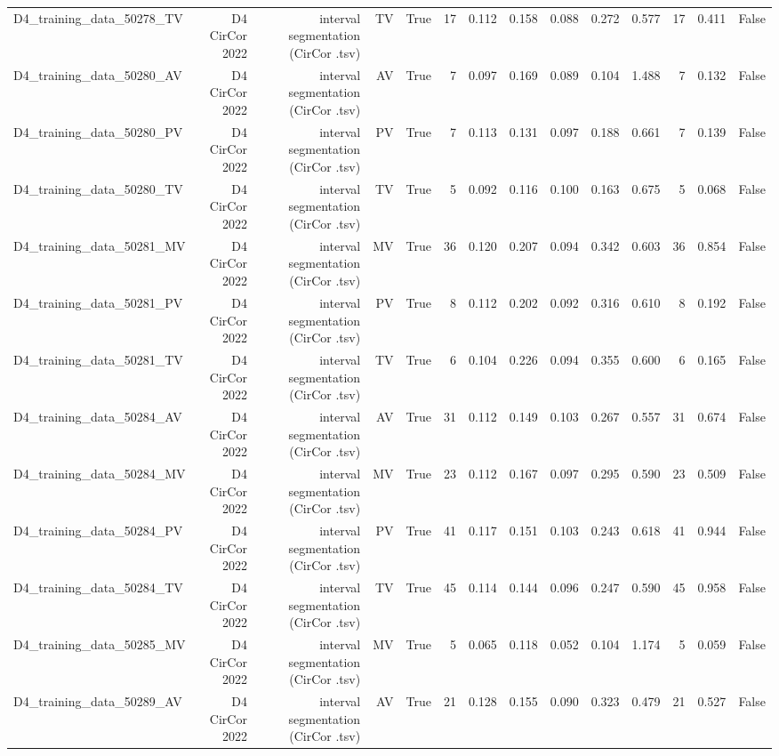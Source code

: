 \begin{table}[htbp]
\begin{tabular}{lrrrrrrrrrrrrr}
    D4\_training\_data\_50278\_TV & D4 CirCor 2022 & interval segmentation (CirCor .tsv) & TV & True & 17 & 0.112 & 0.158 & 0.088 & 0.272 & 0.577 & 17 & 0.411 & False \\
    D4\_training\_data\_50280\_AV & D4 CirCor 2022 & interval segmentation (CirCor .tsv) & AV & True & 7 & 0.097 & 0.169 & 0.089 & 0.104 & 1.488 & 7 & 0.132 & False \\
    D4\_training\_data\_50280\_PV & D4 CirCor 2022 & interval segmentation (CirCor .tsv) & PV & True & 7 & 0.113 & 0.131 & 0.097 & 0.188 & 0.661 & 7 & 0.139 & False \\
    D4\_training\_data\_50280\_TV & D4 CirCor 2022 & interval segmentation (CirCor .tsv) & TV & True & 5 & 0.092 & 0.116 & 0.100 & 0.163 & 0.675 & 5 & 0.068 & False \\
    D4\_training\_data\_50281\_MV & D4 CirCor 2022 & interval segmentation (CirCor .tsv) & MV & True & 36 & 0.120 & 0.207 & 0.094 & 0.342 & 0.603 & 36 & 0.854 & False \\
    D4\_training\_data\_50281\_PV & D4 CirCor 2022 & interval segmentation (CirCor .tsv) & PV & True & 8 & 0.112 & 0.202 & 0.092 & 0.316 & 0.610 & 8 & 0.192 & False \\
    D4\_training\_data\_50281\_TV & D4 CirCor 2022 & interval segmentation (CirCor .tsv) & TV & True & 6 & 0.104 & 0.226 & 0.094 & 0.355 & 0.600 & 6 & 0.165 & False \\
    D4\_training\_data\_50284\_AV & D4 CirCor 2022 & interval segmentation (CirCor .tsv) & AV & True & 31 & 0.112 & 0.149 & 0.103 & 0.267 & 0.557 & 31 & 0.674 & False \\
    D4\_training\_data\_50284\_MV & D4 CirCor 2022 & interval segmentation (CirCor .tsv) & MV & True & 23 & 0.112 & 0.167 & 0.097 & 0.295 & 0.590 & 23 & 0.509 & False \\
    D4\_training\_data\_50284\_PV & D4 CirCor 2022 & interval segmentation (CirCor .tsv) & PV & True & 41 & 0.117 & 0.151 & 0.103 & 0.243 & 0.618 & 41 & 0.944 & False \\
    D4\_training\_data\_50284\_TV & D4 CirCor 2022 & interval segmentation (CirCor .tsv) & TV & True & 45 & 0.114 & 0.144 & 0.096 & 0.247 & 0.590 & 45 & 0.958 & False \\
    D4\_training\_data\_50285\_MV & D4 CirCor 2022 & interval segmentation (CirCor .tsv) & MV & True & 5 & 0.065 & 0.118 & 0.052 & 0.104 & 1.174 & 5 & 0.059 & False \\
    D4\_training\_data\_50289\_AV & D4 CirCor 2022 & interval segmentation (CirCor .tsv) & AV & True & 21 & 0.128 & 0.155 & 0.090 & 0.323 & 0.479 & 21 & 0.527 & False \\

\end{tabular}
\end{table}

